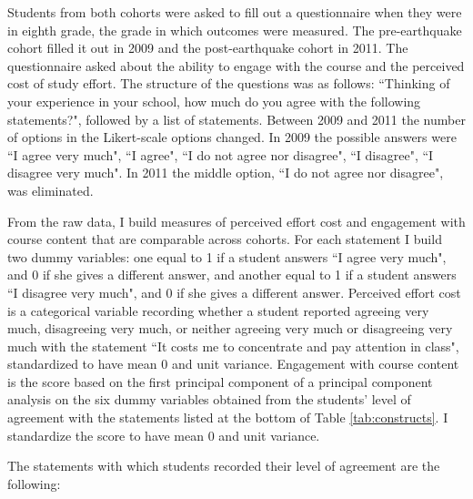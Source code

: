 Students from both cohorts were asked to fill out a questionnaire when they were in eighth grade, the grade in which outcomes were measured. The pre-earthquake cohort filled it out in 2009 and the post-earthquake cohort in 2011. The questionnaire asked about the ability to engage with the course and the perceived cost of study effort. The structure of the questions was as follows: ``Thinking of your experience in your school, how much do you agree with the following statements?", followed by a list of statements. Between 2009 and 2011 the number of options in the Likert-scale options changed. In 2009 the possible answers were ``I agree very much", ``I agree", ``I do not agree nor disagree", ``I disagree", ``I disagree very much". In 2011 the middle option, ``I do not agree nor disagree", was eliminated. \par 

From the raw data, I build measures of perceived effort cost and engagement with course content that are comparable across cohorts. For each statement I build two dummy variables: one equal to 1 if a student answers ``I agree very much", and 0 if she gives a different answer, and another equal to 1 if a student answers ``I disagree very much", and 0 if she gives a different answer. Perceived effort cost is a categorical variable recording whether a student reported agreeing very much, disagreeing very much, or neither agreeing very much or disagreeing very much with the statement ``It costs me to concentrate and pay attention in class", standardized to have mean 0 and unit variance. Engagement with course content is the score based on the first principal component of a principal component analysis on the six dummy variables obtained from the students' level of agreement with the statements listed at the bottom of Table \ref{tab:constructs}. I standardize the score to have mean 0 and unit variance. \par 


The statements with which students recorded their level of agreement are the following: \par 




